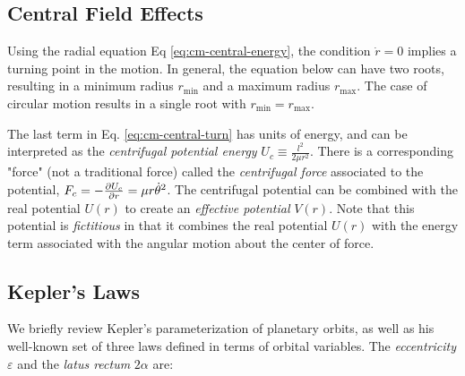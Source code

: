 \subsection{Central Field Effects}
Using the radial equation Eq \ref{eq:cm-central-energy}, the condition $\dot{r}=0$ implies a turning point in the motion. In general, the equation below can have two roots, resulting in a minimum radius $r_{\text{min}}$ and a maximum radius $r_{\text{max}}$. The case of circular motion results in a single root with $r_{\text{min}}= r_{\text{max}}$.


The last term in Eq. \ref{eq:cm-central-turn} has units of energy, and can be interpreted as the \textit{centrifugal potential energy} $U_c \equiv \frac{l^2}{2\mu r^2}$. There is a corresponding "force" (not a traditional force) called the \textit{centrifugal force} associated to the potential, $F_c = -\frac{\partial U_c}{\partial r} = \mu r \dot{\theta}^2$. The centrifugal potential can be combined with the real potential $U(r)$ to create an \textit{effective potential} $V(r)$. Note that this potential is \textit{fictitious} in that it combines the real potential $U(r)$ with the energy term associated with the angular motion about the center of force.



\subsection{Kepler's Laws}
We briefly review Kepler's parameterization of planetary orbits, as well as his well-known set of three laws defined in terms of orbital variables. The \textit{eccentricity} $\varepsilon$ and the \textit{latus rectum} $2\alpha$ are:

